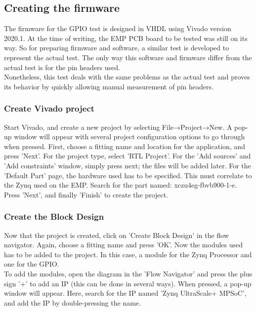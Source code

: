 \subsection{Creating the firmware}

The firmware for the GPIO test is designed in VHDL using Vivado version 2020.1. At the time of writing, the EMP PCB board to be tested was still on its way. So for preparing firmware and software, a similar test is developed to represent the actual test. The only way this software and firmware differ from the actual test is for the pin headers used. \\

\noindent Nonetheless, this test deals with the same problems as the actual test and proves its behavior by quickly allowing manual measurement of pin headers. 

\subsubsection*{Create Vivado project}
Start Vivado, and create a new project by selecting File→Project→New. A pop-up window will appear with several project configuration options to go through when pressed. First, choose a fitting name and location for the application, and press 'Next'. For the project type, select 'RTL Project'. For the 'Add sources' and 'Add constraints' window, simply press next; the files will be added later. For the 'Default Part' page, the hardware used has to be specified. This must correlate to the Zynq used on the EMP. Search for the part named: xczu4eg-fbvb900-1-e. Press 'Next', and finally 'Finish' to create the project.

\subsubsection*{Create the Block Design}
Now that the project is created, click on 'Create Block Design' in the flow navigator. Again, choose a fitting name and press 'OK'. Now the modules used has to be added to the project. In this case, a module for the Zynq Processor and one for the GPIO. \\

\noindent To add the modules, open the diagram in the 'Flow Navigator' and press the plus sign '+' to add an IP (this can be done in several ways). When pressed, a pop-up window will appear. Here, search for the IP  named 'Zynq UltraScale+ MPSoC', and add the IP by double-pressing the name. 

